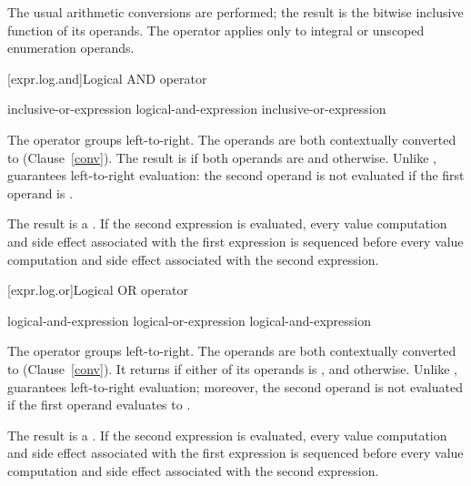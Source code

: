\pnum
The usual arithmetic conversions are performed; the result is the
bitwise inclusive  function of its operands. The
operator applies only to integral or unscoped enumeration operands.

[expr.log.and]{Logical AND operator}%
%
%
%

\begin{bnf}
\br
    inclusive-or-expression\br
    logical-and-expression \terminal{\&\&} inclusive-or-expression
\end{bnf}

\pnum
The \tcode{\&\&} operator groups left-to-right. The operands are both
contextually converted to 
(Clause~\ref{conv}). The
result is  if both operands are  and
 otherwise. Unlike \tcode{\&}, \tcode{\&\&} guarantees
left-to-right evaluation: the second operand is not evaluated if the
first operand is .

\pnum
The result is a .
%
If the second expression is evaluated, every
%
value computation and
side
effect associated with the first expression is sequenced before every
value computation and side effect associated with the second expression.

[expr.log.or]{Logical OR operator}%
%
%
%

\begin{bnf}
\br
    logical-and-expression\br
    logical-or-expression \terminal{$||$} logical-and-expression
\end{bnf}

\pnum
The \tcode{$||$} operator groups left-to-right. The operands are both
contextually converted to 
(Clause~\ref{conv}). It returns
 if either of its operands is , and
 otherwise. Unlike \tcode{$|$}, \tcode{$||$} guarantees
left-to-right evaluation; moreover, the second operand is not evaluated
if the first operand evaluates to .

\pnum
The result is a .
%
If the second expression is evaluated, every
%
value computation and
%
side effect
associated with the first expression is sequenced before every value computation
and side effect associated with the second expression.


